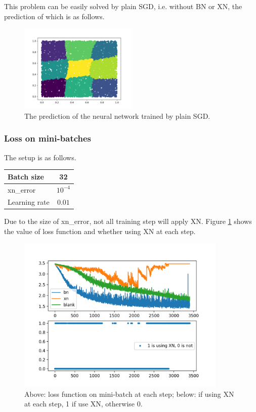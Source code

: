 This problem can be easily solved by plain SGD, i.e. without BN or XN, the prediction of which is as follows.

\begin{figure}[H]
	\center
	\includegraphics*[width=0.5\textwidth]{./figures/XN_Points_SGD_pred.png}
	\caption{The prediction of the neural network trained by plain SGD.}
\end{figure}

\subsubsection{Loss on mini-batches}

The setup is as follows. 

\begin{center}
	\begin{tabular}{|l|c|}
		\hline
		Batch size & 32\\
		\hline
		xn\_error & $10^{-4}$\\
		\hline
		Learning rate & $0.01$\\
		\hline
	\end{tabular}
\end{center}

Due to the size of xn\_error, not all training step will apply XN. Figure \ref{fig:XN_points_1} shows the value of loss function and whether using XN at each step.

\begin{figure}[H]
	\center
	\includegraphics*[width=10cm]{./figures/XN_Points.png}
	\caption{Above: loss function on mini-batch at each step; below: if using XN at each step, 1 if use XN, otherwise 0.}
	\label{fig:XN_points_1}
\end{figure}

